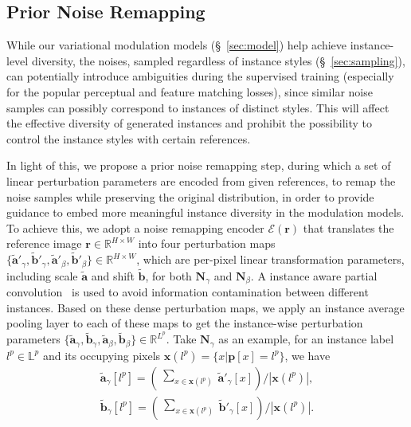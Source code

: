\documentclass[final]{cvpr}
\begin{document}
\subsection{Prior Noise Remapping}
\label{sec:noise}
While our variational modulation models (\S~\ref{sec:model}) help achieve instance-level diversity, the noises, sampled regardless of instance styles (\S~\ref{sec:sampling}), can potentially introduce ambiguities during the supervised training (especially for the popular perceptual and feature matching losses), since similar noise samples can possibly correspond to instances of distinct styles. This will affect the effective diversity of generated instances and prohibit the possibility to control the instance styles with certain references.

In light of this, we propose a prior noise remapping step, during which a set of linear perturbation parameters are encoded from given references, to remap the noise samples while preserving the original distribution, in order to provide guidance to embed more meaningful instance diversity in the modulation models. To achieve this, we adopt a noise remapping encoder $\mathcal{E}(\bm{r})$ that translates the reference image $\bm{r}\in\mathbb{R}^{H\times W}$ into four perturbation maps $\{\tilde{\bm{a}}'_\gamma,\tilde{\bm{b}}'_\gamma,\tilde{\bm{a}}'_\beta,\tilde{\bm{b}}'_\beta\}\in\mathbb{R}^{H\times W}$, which are per-pixel linear transformation parameters, including scale $\tilde{\bm{a}}$ and shift $\tilde{\bm{b}}$, for both $\bm{N}_\gamma$ and $\bm{N}_\beta$. A instance aware partial convolution~\cite{harley2017segmentation,liu2018image} is used to avoid information contamination between different instances.
Based on these dense perturbation maps, we apply an instance average pooling layer to each of these maps to get the instance-wise perturbation parameters $\{\tilde{\bm{a}}_\gamma,\tilde{\bm{b}}_\gamma,\tilde{\bm{a}}_\beta,\tilde{\bm{b}}_\beta\}\in\mathbb{R}^{L^p}$. Take $\bm{N}_\gamma$ as an example, for an instance label $l^p\in\mathbb{L}^p$ and its occupying pixels $\bm{x}(l^p)=\{x|\bm{p}[x]=l^p\}$, we have
\begin{equation}
\begin{split}
   \tilde{\bm{a}}_\gamma[l^p]=(\begin{matrix}\sum_{x\in\bm{x}(l^p)}\end{matrix}\tilde{\bm{a}}'_\gamma[x])/|\bm{x}(l^p)|,\\
   \tilde{\bm{b}}_\gamma[l^p]=(\begin{matrix}\sum_{x\in\bm{x}(l^p)}\end{matrix}\tilde{\bm{b}}'_\gamma[x])/|\bm{x}(l^p)|.
\end{split}
\end{equation}
\end{document}
